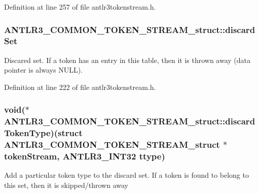 Definition at line 257 of file antlr3tokenstream.\-h.

\hypertarget{struct_a_n_t_l_r3___c_o_m_m_o_n___t_o_k_e_n___s_t_r_e_a_m__struct_a253949433cc0cae9544687a2f9e1facd}{
\subsubsection[{discard\-Set}]{ A\-N\-T\-L\-R3\-\_\-\-C\-O\-M\-M\-O\-N\-\_\-\-T\-O\-K\-E\-N\-\_\-\-S\-T\-R\-E\-A\-M\-\_\-struct\-::discard\-Set}}\label{struct_a_n_t_l_r3___c_o_m_m_o_n___t_o_k_e_n___s_t_r_e_a_m__struct_a253949433cc0cae9544687a2f9e1facd}
Discared set. If a token has an entry in this table, then it is thrown away (data pointer is always N\-U\-L\-L). 

Definition at line 222 of file antlr3tokenstream.\-h.

\hypertarget{struct_a_n_t_l_r3___c_o_m_m_o_n___t_o_k_e_n___s_t_r_e_a_m__struct_a9342253f1da5c79b615324f77c523d70}{
\subsubsection[{discard\-Token\-Type}]{\setlength{\rightskip}{0pt plus 5cm}void($\ast$ A\-N\-T\-L\-R3\-\_\-\-C\-O\-M\-M\-O\-N\-\_\-\-T\-O\-K\-E\-N\-\_\-\-S\-T\-R\-E\-A\-M\-\_\-struct\-::discard\-Token\-Type)(struct {\bf A\-N\-T\-L\-R3\-\_\-\-C\-O\-M\-M\-O\-N\-\_\-\-T\-O\-K\-E\-N\-\_\-\-S\-T\-R\-E\-A\-M\-\_\-struct} $\ast$token\-Stream, {\bf A\-N\-T\-L\-R3\-\_\-\-I\-N\-T32} ttype)}}\label{struct_a_n_t_l_r3___c_o_m_m_o_n___t_o_k_e_n___s_t_r_e_a_m__struct_a9342253f1da5c79b615324f77c523d70}
Add a particular token type to the discard set. If a token is found to belong to this set, then it is skipped/thrown away 

